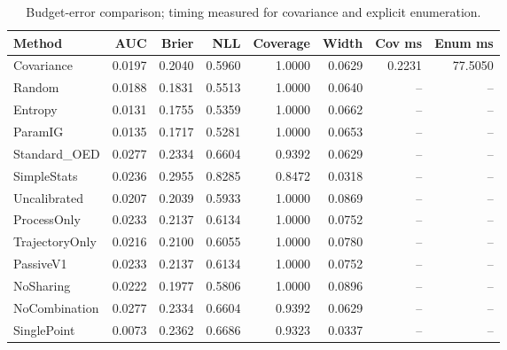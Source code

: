 \begin{table}[t]
\caption{Budget-error comparison; timing measured for covariance and explicit enumeration.}
\label{tab:experiment2}
\begin{tabular}{lrrrrrrr}
\toprule
Method & AUC & Brier & NLL & Coverage & Width & Cov ms & Enum ms \\
\midrule
Covariance & 0.0197 & 0.2040 & 0.5960 & 1.0000 & 0.0629 & 0.2231 & 77.5050 \\
Random & 0.0188 & 0.1831 & 0.5513 & 1.0000 & 0.0640 & -- & -- \\
Entropy & 0.0131 & 0.1755 & 0.5359 & 1.0000 & 0.0662 & -- & -- \\
ParamIG & 0.0135 & 0.1717 & 0.5281 & 1.0000 & 0.0653 & -- & -- \\
Standard\_OED & 0.0277 & 0.2334 & 0.6604 & 0.9392 & 0.0629 & -- & -- \\
SimpleStats & 0.0236 & 0.2955 & 0.8285 & 0.8472 & 0.0318 & -- & -- \\
Uncalibrated & 0.0207 & 0.2039 & 0.5933 & 1.0000 & 0.0869 & -- & -- \\
ProcessOnly & 0.0233 & 0.2137 & 0.6134 & 1.0000 & 0.0752 & -- & -- \\
TrajectoryOnly & 0.0216 & 0.2100 & 0.6055 & 1.0000 & 0.0780 & -- & -- \\
PassiveV1 & 0.0233 & 0.2137 & 0.6134 & 1.0000 & 0.0752 & -- & -- \\
NoSharing & 0.0222 & 0.1977 & 0.5806 & 1.0000 & 0.0896 & -- & -- \\
NoCombination & 0.0277 & 0.2334 & 0.6604 & 0.9392 & 0.0629 & -- & -- \\
SinglePoint & 0.0073 & 0.2362 & 0.6686 & 0.9323 & 0.0337 & -- & -- \\
\bottomrule
\end{tabular}
\end{table}
